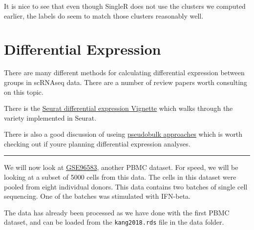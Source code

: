\documentclass[
]{book}
\begin{document}
It is nice to see that even though SingleR does not use the clusters we computed earlier, the labels do seem to match those clusters reasonably well.

\chapter{Differential Expression}\label{de2}

There are many different methods for calculating differential expression between groups in scRNAseq data. There are a number of review papers worth consulting on this topic.

There is the \href{https://satijalab.org/seurat/archive/v3.1/de_vignette.html}{Seurat differential expression Vignette} which walks through the variety implemented in Seurat.

There is also a good discussion of useing \href{http://bioconductor.org/books/3.15/OSCA.multisample/multi-sample-comparisons.html\#creating-pseudo-bulk-samples}{pseudobulk approaches} which is worth checking out if youre planning differential expression analyses.

\begin{center}\rule{0.5\linewidth}{0.5pt}\end{center}

We will now look at \href{https://www.ncbi.nlm.nih.gov/geo/query/acc.cgi?acc=GSE96583}{GSE96583}, another PBMC dataset. For speed, we will be looking at a subset of 5000 cells from this data. The cells in this dataset were pooled from eight individual donors. This data contains two batches of single cell sequencing. One of the batches was stimulated with IFN-beta.

The data has already been processed as we have done with the first PBMC dataset, and can be loaded from the \texttt{kang2018.rds} file in the data folder.
\end{document}
